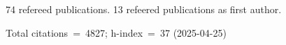 74 refereed publications. 13 refeered publications as first author.

Total citations~=~4827; h-index~=~37 (2025-04-25)